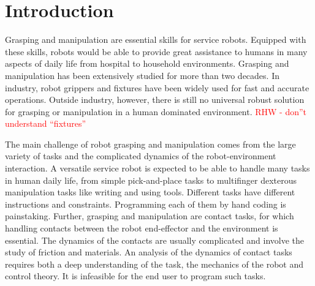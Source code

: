 \chapter{Introduction}
\label{cha1}

\setcounter{page}{1}
Grasping and manipulation are essential skills for service robots. Equipped with these skills, robots would be able to provide great assistance to humans in many aspects of daily life from hospital to household environments. Grasping and manipulation has been extensively studied for more than two decades. In industry, robot grippers and fixtures have been widely used for fast and accurate operations. Outside industry, however, there is still no universal robust solution for grasping or manipulation in a human dominated environment.
\textcolor{red}{RHW - don''t understand ``fixtures''}

The main challenge of robot grasping and manipulation comes from the large variety of tasks and the complicated dynamics of the robot-environment interaction. A versatile service robot is expected to be able to handle many tasks in human daily life, from simple pick-and-place tasks to multifinger dexterous manipulation tasks like writing and using tools. Different tasks have different instructions and constraints. Programming each of them by hand coding is painstaking. Further, grasping and manipulation are contact tasks, for which handling contacts between the robot end-effector and the environment is essential. The dynamics of the contacts are usually complicated and involve the study of friction and materials. An analysis of the dynamics of contact tasks requires both a deep understanding of the task, the mechanics of the robot and control theory. It is infeasible for the end user to program such tasks.

